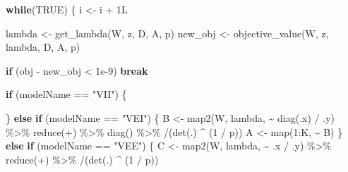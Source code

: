 \documentclass[
]{book}
\newenvironment{Shaded}{\begin{snugshade}}{\end{snugshade}}
\newcommand{\AttributeTok}[1]{\textcolor[rgb]{0.77,0.63,0.00}{#1}}
\newcommand{\ConstantTok}[1]{\textcolor[rgb]{0.00,0.00,0.00}{#1}}
\newcommand{\ControlFlowTok}[1]{\textcolor[rgb]{0.13,0.29,0.53}{\textbf{#1}}}
\newcommand{\DecValTok}[1]{\textcolor[rgb]{0.00,0.00,0.81}{#1}}
\newcommand{\FloatTok}[1]{\textcolor[rgb]{0.00,0.00,0.81}{#1}}
\newcommand{\FunctionTok}[1]{\textcolor[rgb]{0.00,0.00,0.00}{#1}}
\newcommand{\NormalTok}[1]{#1}
\newcommand{\OtherTok}[1]{\textcolor[rgb]{0.56,0.35,0.01}{#1}}
\newcommand{\SpecialCharTok}[1]{\textcolor[rgb]{0.00,0.00,0.00}{#1}}
\newcommand{\StringTok}[1]{\textcolor[rgb]{0.31,0.60,0.02}{#1}}
\begin{document}
\begin{Shaded}
\begin{Highlighting}[]
  \ControlFlowTok{while}\NormalTok{(}\ConstantTok{TRUE}\NormalTok{) \{}
\NormalTok{    i }\OtherTok{\textless{}{-}}\NormalTok{ i }\SpecialCharTok{+}\NormalTok{ 1L}
    
\NormalTok{    lambda }\OtherTok{\textless{}{-}} \FunctionTok{get\_lambda}\NormalTok{(W, z, D, A, p)}
\NormalTok{    new\_obj }\OtherTok{\textless{}{-}} \FunctionTok{objective\_value}\NormalTok{(W, z, lambda, D, A, p)}
    
    \ControlFlowTok{if}\NormalTok{ (obj }\SpecialCharTok{{-}}\NormalTok{ new\_obj }\SpecialCharTok{\textless{}} \FloatTok{1e{-}9}\NormalTok{) }\ControlFlowTok{break}
    
    \ControlFlowTok{if}\NormalTok{ (modelName }\SpecialCharTok{==} \StringTok{"VII"}\NormalTok{) \{}
      
\NormalTok{    \} }\ControlFlowTok{else} \ControlFlowTok{if}\NormalTok{ (modelName }\SpecialCharTok{==} \StringTok{"VEI"}\NormalTok{) \{}
\NormalTok{      B }\OtherTok{\textless{}{-}} \FunctionTok{map2}\NormalTok{(W, lambda, }\SpecialCharTok{\textasciitilde{}} \FunctionTok{diag}\NormalTok{(.x) }\SpecialCharTok{/}\NormalTok{ .y) }\SpecialCharTok{\%\textgreater{}\%} 
        \FunctionTok{reduce}\NormalTok{(}\StringTok{\textasciigrave{}}\AttributeTok{+}\StringTok{\textasciigrave{}}\NormalTok{) }\SpecialCharTok{\%\textgreater{}\%}
        \FunctionTok{diag}\NormalTok{() }\SpecialCharTok{\%\textgreater{}\%}
        \StringTok{\textasciigrave{}}\AttributeTok{/}\StringTok{\textasciigrave{}}\NormalTok{(}\FunctionTok{det}\NormalTok{(.) }\SpecialCharTok{\^{}}\NormalTok{ (}\DecValTok{1} \SpecialCharTok{/}\NormalTok{ p))}
\NormalTok{      A }\OtherTok{\textless{}{-}} \FunctionTok{map}\NormalTok{(}\DecValTok{1}\SpecialCharTok{:}\NormalTok{K, }\SpecialCharTok{\textasciitilde{}}\NormalTok{ B)}
\NormalTok{    \} }\ControlFlowTok{else} \ControlFlowTok{if}\NormalTok{ (modelName }\SpecialCharTok{==} \StringTok{"VEE"}\NormalTok{) \{}
\NormalTok{      C }\OtherTok{\textless{}{-}} \FunctionTok{map2}\NormalTok{(W, lambda, }\SpecialCharTok{\textasciitilde{}}\NormalTok{ .x }\SpecialCharTok{/}\NormalTok{ .y) }\SpecialCharTok{\%\textgreater{}\%} 
        \FunctionTok{reduce}\NormalTok{(}\StringTok{\textasciigrave{}}\AttributeTok{+}\StringTok{\textasciigrave{}}\NormalTok{) }\SpecialCharTok{\%\textgreater{}\%}
        \StringTok{\textasciigrave{}}\AttributeTok{/}\StringTok{\textasciigrave{}}\NormalTok{(}\FunctionTok{det}\NormalTok{(.) }\SpecialCharTok{\^{}}\NormalTok{ (}\DecValTok{1} \SpecialCharTok{/}\NormalTok{ p))}
      

\end{Highlighting}
\end{Shaded}
\end{document}
